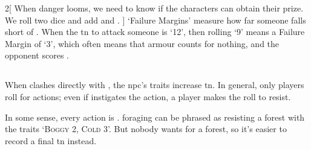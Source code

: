 \begin{multicols}{2}[%
  \noindent%
  When danger looms, we need to know if the characters can obtain their prize.
  We roll two dice and add  and .
]
`Failure Margins' measure how far someone falls short of .
When the \gls{tn} to attack someone is `12', then rolling `9' means a Failure Margin of `3', which often means that \gls{armour} counts for nothing, and the opponent scores .

\bigbreak

\subsection{}
\label{resistedactions}

When  clashes directly with , the \gls{npc}'s \glspl{trait} increase \gls{tn}.
In general, only players roll for \glspl{action}; even if  instigates the \gls{action}, a player makes the roll to resist.

In some sense, every \gls{action} is .
\Gls{foraging} can be phrased as  resisting a forest with the \glspl{trait} `{\scshape Boggy 2, Cold 3}'.
But nobody wants  for a forest, so it's easier to record a final \gls{tn} instead.

\end{multicols}

\section{}
\label{weight}

